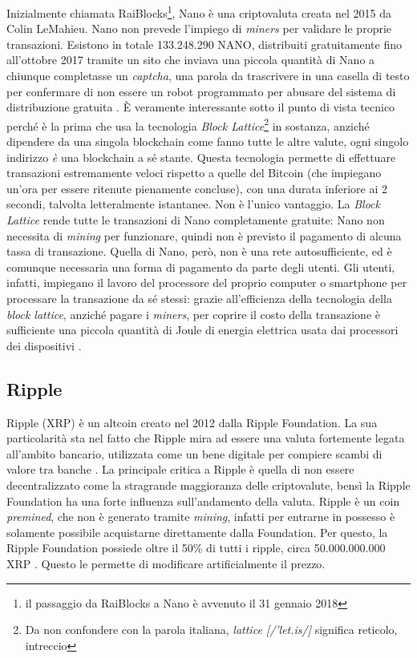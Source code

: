\documentclass {article}
\begin{document}
Inizialmente chiamata RaiBlocks\footnote{il passaggio da RaiBlocks a Nano è avvenuto il 31 gennaio 2018}, Nano è una criptovaluta creata nel 2015 da Colin LeMahieu.
Nano non prevede l'impiego di \textit{miners} per validare le proprie transazioni.
Esistono in totale 133.248.290 NANO, distribuiti gratuitamente fino all'ottobre 2017 tramite un sito che inviava una piccola quantità di Nano a chiunque completasse un \textit{captcha}, una parola da trascrivere in una casella di testo per confermare di non essere un robot programmato per abusare del sistema di distribuzione gratuita \cite{nanofaq}.
È veramente interessante sotto il punto di vista tecnico perché è la prima che usa la tecnologia \textit{Block Lattice}\footnote{Da non confondere con la parola italiana, \textit{lattice [/'let.is/]} significa reticolo, intreccio} in sostanza, anziché dipendere da una singola blockchain come fanno tutte le altre valute, ogni singolo indirizzo \emph{è} una blockchain a sé stante.
Questa tecnologia permette di effettuare transazioni estremamente veloci rispetto a quelle del Bitcoin (che impiegano un'ora per essere ritenute pienamente concluse), con una durata inferiore ai 2 secondi, talvolta letteralmente istantanee.
Non è l'unico vantaggio.
La \textit{Block Lattice} rende tutte le transazioni di Nano completamente gratuite: Nano non necessita di \textit{mining} per funzionare, quindi non è previsto il pagamento di alcuna tassa di transazione.
Quella di Nano, però, non è una rete autosufficiente, ed è comunque necessaria una forma di pagamento da parte degli utenti.
Gli utenti, infatti, impiegano il lavoro del processore del proprio computer o smartphone per processare la transazione da sé stessi: grazie all'efficienza della tecnologia della \textit{block lattice}, anziché pagare i \textit{miners}, per coprire il costo della transazione è sufficiente una piccola quantità di Joule di energia elettrica usata dai processori dei dispositivi \cite{nanopow}.


\subsection {Ripple}


Ripple (XRP) è un altcoin creato nel 2012 dalla Ripple Foundation.
La sua particolarità sta nel fatto che Ripple mira ad essere una valuta fortemente legata all'ambito bancario, utilizzata come un bene digitale per compiere scambi di valore tra banche \cite{whatsripple}.
La principale critica a Ripple è quella di non essere decentralizzato come la stragrande maggioranza delle criptovalute, bensì la Ripple Foundation ha una forte influenza sull'andamento della valuta.
Ripple è un coin \textit{premined}, che non è generato tramite \textit{mining}, infatti per entrarne in possesso è solamente possibile acquistarne direttamente dalla Foundation.
Per questo, la Ripple Foundation possiede oltre il 50\% di tutti i ripple, circa 50.000.000.000 XRP \cite{ripple}. Questo le permette di modificare artificialmente il prezzo.
\end{document}
